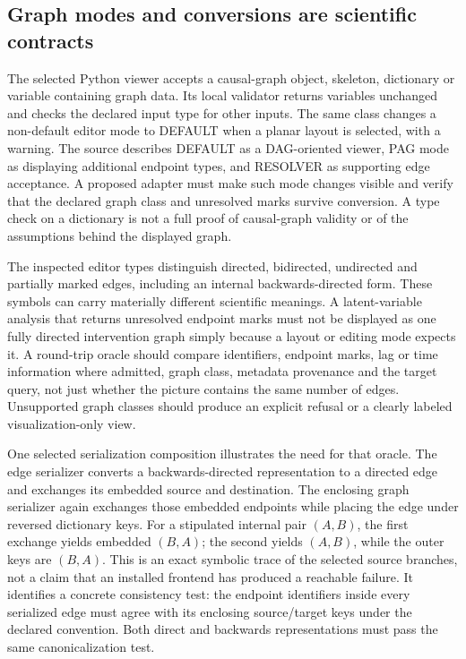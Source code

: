 \subsection{Graph modes and conversions are scientific contracts}
The selected Python viewer accepts a causal-graph object, skeleton, dictionary
or variable containing graph data. Its local validator returns variables
unchanged and checks the declared input type for other inputs. The same class
changes a non-default editor mode to DEFAULT when a planar layout is selected,
with a warning. The source describes DEFAULT as a DAG-oriented viewer, PAG
mode as displaying additional endpoint types, and RESOLVER as supporting
edge acceptance. A proposed adapter must make such mode changes visible and
verify that the declared graph class and unresolved marks survive conversion.
A type check on a dictionary is not a full proof of causal-graph validity or
of the assumptions behind the displayed graph.~\citep{exec25_dara_source}

The inspected editor types distinguish directed, bidirected, undirected and
partially marked edges, including an internal backwards-directed form. These
symbols can carry materially different scientific meanings. A latent-variable
analysis that returns unresolved endpoint marks must not be displayed as one
fully directed intervention graph simply because a layout or editing mode
expects it. A round-trip oracle should compare identifiers, endpoint marks,
lag or time information where admitted, graph class, metadata provenance and
the target query, not just whether the picture contains the same number of
edges. Unsupported graph classes should produce an explicit refusal or a
clearly labeled visualization-only view.~\citep{exec25_dara_source,exec25_dara_choice}

One selected serialization composition illustrates the need for that oracle.
The edge serializer converts a backwards-directed representation to a directed
edge and exchanges its embedded source and destination. The enclosing graph
serializer again exchanges those embedded endpoints while placing the edge
under reversed dictionary keys. For a stipulated internal pair $(A,B)$, the
first exchange yields embedded $(B,A)$; the second yields $(A,B)$, while the
outer keys are $(B,A)$. This is an exact symbolic trace of the selected source
branches, not a claim that an installed frontend has produced a reachable
failure. It identifies a concrete consistency test: the endpoint identifiers
inside every serialized edge must agree with its enclosing source/target
keys under the declared convention. Both direct and backwards representations
must pass the same canonicalization test.~\citep{exec25_dara_source,exec25_dara_choice}

